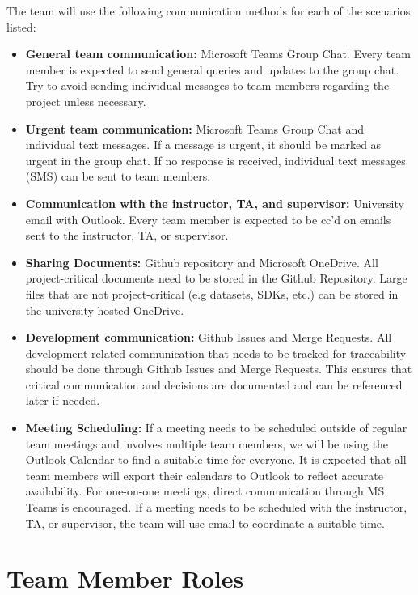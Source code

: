\documentclass{article}
\begin{document}
The team will use the following communication methods for each of the scenarios listed:
\begin{itemize}
  \item \textbf{General team communication:} Microsoft Teams Group Chat. Every team member is expected to send general queries and updates to the group chat.
  Try to avoid sending individual messages to team members regarding the project unless necessary.
  \item \textbf{Urgent team communication:} Microsoft Teams Group Chat and individual text messages. 
  If a message is urgent, it should be marked as urgent in the group chat. If no response is received, individual text messages (SMS) can be sent to team members.
  \item \textbf{Communication with the instructor, TA, and supervisor:} University email with Outlook. Every team member is expected to be cc'd on emails sent to the instructor, TA, or supervisor.
  \item \textbf{Sharing Documents:} Github repository and Microsoft OneDrive. All project-critical documents need to be stored in the Github Repository. 
  Large files that are not project-critical (e.g datasets, SDKs, etc.) can be stored in the university hosted OneDrive.
  \item \textbf{Development communication:} Github Issues and Merge Requests. All development-related communication that needs to be tracked for 
  traceability should be done through Github Issues and Merge Requests. This ensures that critical communication and decisions 
  are documented and can be referenced later if needed.
  \item \textbf{Meeting Scheduling:} If a meeting needs to be scheduled outside of regular team meetings and involves multiple team members, we will be using 
  the Outlook Calendar to find a suitable time for everyone. It is expected that all team members will export their calendars to Outlook to reflect accurate availability. For one-on-one meetings, direct communication through MS Teams is encouraged. If a meeting needs to be scheduled
  with the instructor, TA, or supervisor, the team will use email to coordinate a suitable time. 
\end{itemize}

\section{Team Member Roles}
\end{document}
